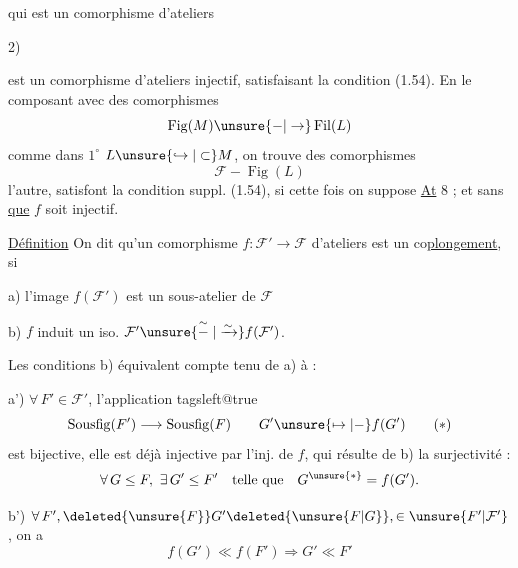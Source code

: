 qui est un comorphisme d'ateliers

2)  est un comorphisme d'ateliers injectif, satisfaisant la condition  (1.54). En le composant avec des comorphismes 
\[
\operatorname{Fig}(M)\unsure{-|\to}\operatorname{Fil}(L)
\]
 comme dans $1^\circ$  $L\unsure{\hookrightarrow|\subset}M$, on trouve des comorphismes
\[
\mathcal F-\operatorname{Fig}(L)
\]
 l'autre,  satisfont la condition suppl.  (1.54), si cette fois on suppose \uline{At} 8 ; et sans \uline{que} $f$ soit  injectif.

\uline{Définition} On dit qu'un comorphisme $f:\mathcal F'\to\mathcal F$ d'ateliers est un co\uline{plongement}, si


a) l'image $f(\mathcal F')$ est un sous-atelier de $\mathcal F$ 
\par b) $f$ induit un iso. $\mathcal F'\unsure{\stackrel{\sim}{-}|\xrightarrow{\sim}}f(\mathcal F')$.

 Les conditions  b) équivalent \unsure{(}compte tenu de a) à : \par a') $\forall\,F'\in\mathcal F'$,  l'application
\begingroup\csname tagsleft@true\endcsname
\[
\operatorname{Sousfig}(F')\longrightarrow\operatorname{Sousfig}(F)\qquad G'\unsure{\mapsto|-} f(G')\tag*{$(*)$}
\]
\endgroup
est bijective,   elle est déjà injective par l'inj. de $f$, qui résulte de b) la surjectivité :
\[
\forall\,G\leq F,\ \exists\,G'\leq F'\quad\text{telle que}\quad G^{\unsure{*}}=f(G').
\]

b') $\forall\, F',\deleted{\unsure{F}}G'\deleted{\unsure{F|G}},\in \unsure{F'|\mathcal F'}$, on a
\[
f(G')\ll f(F')\Longrightarrow G'\ll F'
\]

